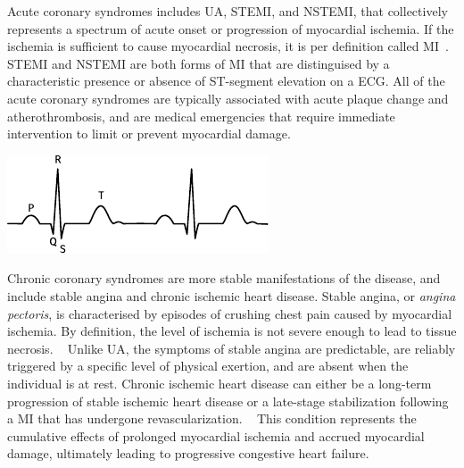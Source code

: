 Acute coronary syndromes includes 
\ac{UA}, \ac{STEMI}, and \ac{NSTEMI},
that collectively represents a spectrum of acute onset or progression of 
myocardial ischemia.
If the ischemia is sufficient to cause myocardial necrosis, 
it is per definition called \ac{MI}~\autocite{thygesenFourth2019}.
\ac{STEMI} and \ac{NSTEMI} are both forms of \ac{MI} that are distinguised
by a characteristic presence or absence of ST-segment elevation on a \ac{ECG}.
All of the acute coronary syndromes are typically associated 
with acute plaque change and atherothrombosis, 
and are medical emergencies that require immediate 
intervention to limit or prevent myocardial damage.
~\autocite{kumarRobbins2014}

\begin{marginfigure}%
    \vspace{1em}
    \includegraphics{graphics/electrocardiogram}
    \caption[Normal QRS complex]{%
        Schematic of a normal sinus rhythm as seen from an ECG. 
        In \ac{STEMI}, the ST-segment is found elevated.
    }
    \vspace{1em}
    \label{fig:ecg}
\end{marginfigure}%

Chronic coronary syndromes are more stable manifestations of the disease,
and include stable angina and chronic ischemic heart disease.
Stable angina, or \textit{angina pectoris}, is characterised by episodes of
crushing chest pain caused by myocardial ischemia.
By definition, the level of ischemia is not severe enough to lead to
tissue necrosis. 
~\autocite{knuuti20192020}
Unlike \ac{UA}, the symptoms of stable angina are predictable,
are reliably triggered by a specific level of physical exertion, 
and are absent when the individual is at rest. 
Chronic ischemic heart disease can either be a long-term progression of stable
ischemic heart disease or a late-stage stabilization following a \ac{MI} that
has undergone revascularization. 
~\autocite{knuuti20192020}
This condition represents the cumulative
effects of prolonged myocardial ischemia and accrued myocardial damage,
ultimately leading to progressive congestive heart failure.
~\autocite{kumarRobbins2014}


